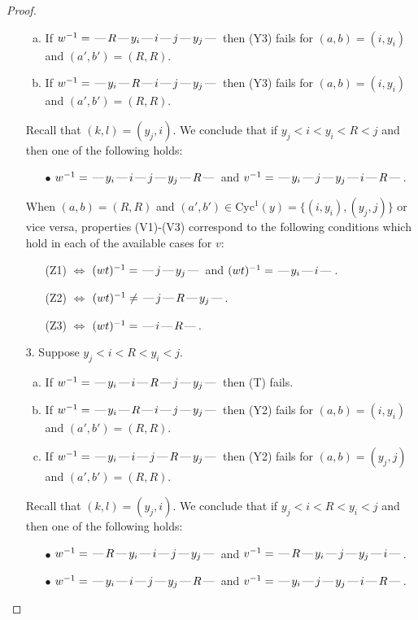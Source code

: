 \documentclass[10pt]{article}
\theoremstyle{definition}
\theoremstyle{definition}
\def\dash{\text{\hspace{0.5mm}---\hspace{0.5mm}}}
\def\Cyc{\mathrm{Cyc}}
\begin{document}
\begin{proof}
\begin{enumerate}
\begin{enumerate}[(a)]
\item If $w^{-1} = \dash R\dash y_i\dash i\dash j\dash y_j\dash $ then (Y3) fails for $(a,b)=(i,y_i)$ and $(a',b')=(R,R)$.
\item If $w^{-1} = \dash y_i\dash R\dash i\dash j\dash y_j\dash $ then (Y3) fails for $(a,b)=(i,y_i)$ and $(a',b')=(R,R)$.
\end{enumerate}
Recall that $(k,l) = (y_j,i)$.
We conclude that if $y_j < i < y_i < R < j$ and then one of the following holds:
\begin{enumerate}
\item[$\bullet$] $w^{-1} = \dash y_i\dash i\dash j\dash y_j\dash R\dash $ and $v^{-1} = \dash y_i\dash j\dash y_j\dash i\dash R\dash $.
\end{enumerate}
When $(a,b)= (R, R)$ and $(a',b')\in \Cyc^1(y)=\{(i,y_i),(y_j,j)\}$ or vice versa,
properties (V1)-(V3) correspond to the following conditions which hold in
each of the available cases for $v$:
\begin{enumerate}
\item[](Z1) $\Leftrightarrow$ $(wt)^{-1} = \dash j \dash y_j \dash$  and $(wt)^{-1} = \dash y_i \dash i \dash$.
\item[](Z2) $\Leftrightarrow$ $(wt)^{-1} \neq \dash j \dash R \dash y_j \dash$.
\item[](Z3) $\Leftrightarrow$ $(wt)^{-1} = \dash i \dash R \dash$.
\end{enumerate}
\item[$3$.] Suppose $y_j < i < R < y_i < j$.
\begin{enumerate}[(a)]
\item If $w^{-1} = \dash y_i\dash i\dash R\dash j\dash y_j\dash $ then (T) fails.
\item If $w^{-1} = \dash y_i\dash R\dash i\dash j\dash y_j\dash $ then (Y2) fails for $(a,b)=(i,y_i)$ and $(a',b')=(R,R)$.
\item If $w^{-1} = \dash y_i\dash i\dash j\dash R\dash y_j\dash $ then (Y2) fails for $(a,b)=(y_j,j)$ and $(a',b')=(R,R)$.
\end{enumerate}
Recall that $(k,l) = (y_j,i)$.
We conclude that if $y_j < i < R < y_i < j$ and then one of the following holds:
\begin{enumerate}
\item[$\bullet$] $w^{-1} = \dash R\dash y_i\dash i\dash j\dash y_j\dash $ and $v^{-1} = \dash R\dash y_i\dash j\dash y_j\dash i\dash $.
\item[$\bullet$] $w^{-1} = \dash y_i\dash i\dash j\dash y_j\dash R\dash $ and $v^{-1} = \dash y_i\dash j\dash y_j\dash i\dash R\dash $.

\end{enumerate}
\end{enumerate}
\end{proof}
\end{document}
